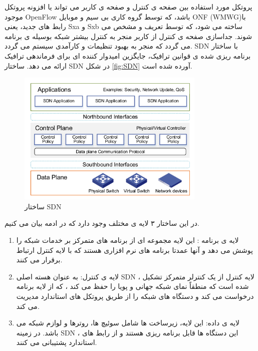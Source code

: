  پروتکل مورد استفاده بین صفحه ی کنترل و صفحه ی کاربر می تواند یا افزونه پروتکل موجود OpenFlow باشد، که توسط گروه کاری بی سیم و موبایل ONF (WMWG)با رابط های جدید، یعنی Sxa و Sxb ساخته می شود، که توسط   تعریف و مشخص می شوند\cite{SDN2}. 
 جداسازی صفحه ی کنترل از کاربر منجر به کنترل بیشتر شبکه بوسیله ی برنامه می گردد که منجر به بهبود تنظیمات و کارآمدی سیستم می گردد.
 SDN
  با ساختار برنامه ریزی شده ی قوانین ترافیک، جایگزین امیدوار کننده ای برای فرماندهی ترافیک ارائه می دهد.
  ساختار SDN در شکل \eqref{fig:SDN} آورده شده است.
  \begin{figure}
  \centering
    \includegraphics[width=0.8\textwidth]{./fig/SDN}
  \caption{ ساختار SDN \cite{SDN3}}
  \label{fig:SDN}
\end{figure} 
  در این ساختار ۳ لایه ی مختلف وجود دارد که در ادمه بیان می کنیم\cite{SDN3}.
  \begin{enumerate}
  \item لایه ی برنامه :
  این لایه مجموعه ای از برنامه های متمرکز بر خدمات شبکه را پوشش می دهد و آنها عمدتا برنامه های نرم افزاری هستند که با لایه کنترل ارتباط برقرار می کنند.
  \item لایه ی کنترل:
  به عنوان هسته اصلی SDN ، لایه کنترل از یک کنترلر متمرکز تشکیل شده است که منطقاً نمای شبکه جهانی و پویا را حفظ می کند ،  که از لایه برنامه درخواست می کند و دستگاه های شبکه را از طریق پروتکل های استاندارد مدیریت می کند.
  \item لایه ی داده:
  این لایه، زیرساخت ها شامل سوئیچ ها، روترها و لوازم شبکه می باشد. در زمینه SDN ، این دستگاه ها قابل برنامه ریزی هستند و از رابط های استاندارد پشتیبانی می کنند.
  \end{enumerate}

